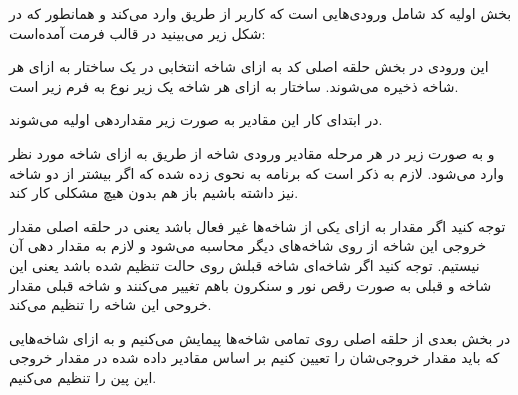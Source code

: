 بخش اولیه کد شامل ورودی‌هایی است که کاربر از طریق 
وارد می‌کند و همانطور که در شکل زیر می‌بینید در قالب فرمت
آمده‌است:

\begin{latin}
	
\end{latin}

این ورودی‌ در بخش حلقه اصلی کد به ازای شاخه انتخابی در یک ساختار
به ازای هر شاخه ذخیره می‌شوند. ساختار 
به ازای هر شاخه یک زیر نوع به فرم زیر است.
\begin{latin}
	
\end{latin}

در ابتدای کار این مقادیر به صورت زیر مقداردهی اولیه می‌شوند.
\begin{latin}
	
\end{latin}
و به صورت زیر در هر مرحله مقادیر ورودی شاخه از طریق 
به ازای شاخه مورد نظر وارد می‌شود. لازم به ذکر است که برنامه به نحوی زده شده که اگر بیشتر از دو شاخه نیز داشته باشیم باز هم بدون هیچ مشکلی کار کند. 

\begin{latin}
	
\end{latin}

توجه کنید اگر مقدار
به ازای یکی از شاخه‌ها غیر فعال باشد یعنی در حلقه اصلی مقدار خروجی این شاخه از روی شاخه‌های دیگر محاسبه می‌شود و لازم به مقدار دهی آن نیستیم. توجه کنید اگر شاخه‌ای شاخه قبلش روی حالت 
تنظیم شده باشد یعنی این شاخه و قبلی به صورت رقص نور و سنکرون باهم تغییر می‌کنند و شاخه قبلی مقدار خروحی این شاخه را تنظیم می‌کند.


در بخش بعدی از حلقه اصلی روی تمامی شاخه‌ها پیمایش می‌کنیم و به ازای شاخه‌هایی که باید مقدار خروجی‌شان را تعیین کنیم بر اساس مقادیر داده شده در
مقدار خروجی این پین را تنظیم می‌کنیم.

